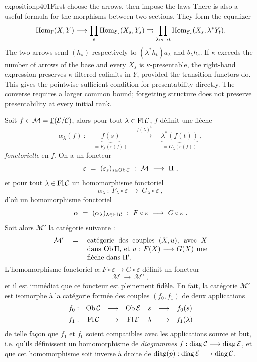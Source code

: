 \begin{dcomment}{exposition}{p401}{First choose the arrows, then impose the laws}
There is also a useful formula for the morphisms between two sections. They form the equalizer
\[
 \operatorname{Hom}_{\Gamma}(X,Y)\longrightarrow
 \prod_s\operatorname{Hom}_{\mathcal E_s}(X_s,Y_s)
 \rightrightarrows
 \prod_{\lambda:s\to t}
 \operatorname{Hom}_{\mathcal E_s}(X_s,\lambda^*Y_t).
\]
The two arrows send $(h_s)$ respectively to $(\lambda^*h_t)a_\lambda$ and $b_\lambda h_s$. If $\kappa$ exceeds the number of arrows of the base and every $X_s$ is $\kappa$-presentable, the right-hand expression preserves $\kappa$-filtered colimits in $Y$, provided the transition functors do. This gives the pointwise sufficient condition for presentability directly. The converse requires a larger common bound; forgetting structure does not preserve presentability at every initial rank.
\end{dcomment}


Soit $f \in \mathcal{M} = \underline{\Gamma}(\mathcal{E}/\mathcal{C})$, alors pour tout $\lambda \in \operatorname{Fl}\mathcal{C}$, $f$ définit une flèche
\[
\alpha_\lambda(f) \ : \quad \underbrace{f(s)}_{= F_\lambda(\varepsilon(f))} \quad \xrightarrow{f(\lambda)^\flat} \quad \underbrace{\lambda^*(f(t))}_{= G_\lambda(\varepsilon(f))} \ ,
\]
\textit{fonctorielle} en $f$. On a un foncteur
\[
\varepsilon \ = \ (\varepsilon_s)_{s\in\Ob\mathcal{C}} \ : \ \mathcal{M} \ \longrightarrow \ \Pi \ ,
\]
et pour tout $\lambda \in \operatorname{Fl}\mathcal{C}$ un homomorphisme fonctoriel
\[
\alpha_\lambda \ : \ F_\lambda \circ \varepsilon \ \longrightarrow \ G_\lambda \circ \varepsilon \ ,
\]
d’où un homomorphisme fonctoriel
\[
\alpha \ = \ (\alpha_\lambda)_{\lambda\in\operatorname{Fl}\mathcal{C}} \ : \ F \circ \varepsilon \ \longrightarrow \ G \circ \varepsilon \ .
\]
Soit alors $\mathcal{M}'$ la catégorie suivante :
\[
\mathcal{M}' \quad = \quad \parbox[t]{0.5\textwidth}{catégorie des couples $(X,u)$, avec $X$ dans $\Ob\Pi$, et $u : F(X) \longrightarrow G(X)$ une flèche dans $\Pi'$.}
\]
L’homomorphisme fonctoriel $\alpha : F \circ \varepsilon \longrightarrow G \circ \varepsilon$ définit un foncteur
\[
\mathcal{M} \ \longrightarrow \ \mathcal{M}' \ ,
\]
et il est immédiat que ce foncteur est pleinement fidèle. En fait, la catégorie $\mathcal{M}'$ est isomorphe à la catégorie formée des couples $(f_0,f_1)$ de deux applications
\[
\begin{array}{lcccccc}
f_0 : & \operatorname{Ob}\mathcal{C} & \longrightarrow & \operatorname{Ob}\mathcal{E} & s & \longmapsto & f_0(s)\\[1ex]
f_1 : & \operatorname{Fl}\mathcal{C} & \longrightarrow & \operatorname{Fl}\mathcal{E} & \lambda & \longmapsto & f_1(\lambda)
\end{array}
\]
de telle façon que $f_1$ et $f_0$ soient compatibles avec les applications source et but, i.e. qu’ils définissent un homomorphisme de \textit{diagrammes} $f : \mathrm{diag}\,\mathcal{C} \longrightarrow \mathrm{diag}\,\mathcal{E}$, et que cet homomorphisme soit inverse à droite de $\mathrm{diag}(p) : \mathrm{diag}\,\mathcal{E} \longrightarrow \mathrm{diag}\,\mathcal{C}$.

